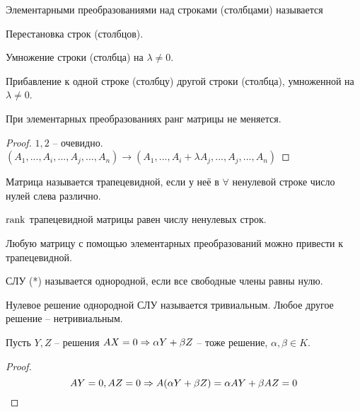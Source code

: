 	\begin{Def}
		Элементарными преобразованиями над строками (столбцами) называется
		\begin{MyList}
			\item Перестановка строк (столбцов).
			\item Умножение строки (столбца) на $\lambda \neq 0$.
			\item Прибавление к одной строке (столбцу) другой строки (столбца), умноженной на $\lambda \neq 0$.
		\end{MyList}
	\end{Def}

	\begin{Thm}
		При элементарных преобразованиях ранг матрицы не меняется.
	\end{Thm}

	\begin{proof}
		$1, 2$ -- очевидно.
		$(A_1, ..., A_i, ..., A_j, ..., A_n) \to (A_1, ..., A_i + \lambda A_j, ..., A_j, ..., A_n)$ 
	\end{proof}

	\begin{Def}
		Матрица называется трапецевидной, если у неё в $\forall$ ненулевой строке число нулей слева различно.
	\end{Def}

	\begin{Rem}
		$\operatorname{rank}$ трапецевидной матрицы равен числу ненулевых строк.
	\end{Rem}

	\begin{Thm}
		Любую матрицу с помощью элементарных преобразований можно привести к трапецевидной.
	\end{Thm}

	\Subsection{Структура решений СЛУ}

	\begin{Def}
		СЛУ (*) называется однородной, если все свободные члены равны нулю.
	\end{Def}

	\begin{Def}
		Нулевое решение однородной СЛУ называется тривиальным. Любое другое решение -- нетривиальным.
	\end{Def}

	\begin{Lm}
		Пусть $Y, Z$ -- решения $AX = 0 \Rightarrow \alpha Y + \beta Z$ -- тоже решение, $\alpha, \beta \in K$.
	\end{Lm}

	\begin{proof}
		\[AY = 0, AZ = 0 \Rightarrow A(\alpha Y + \beta Z) = \alpha AY + \beta AZ = 0\]
	\end{proof}

